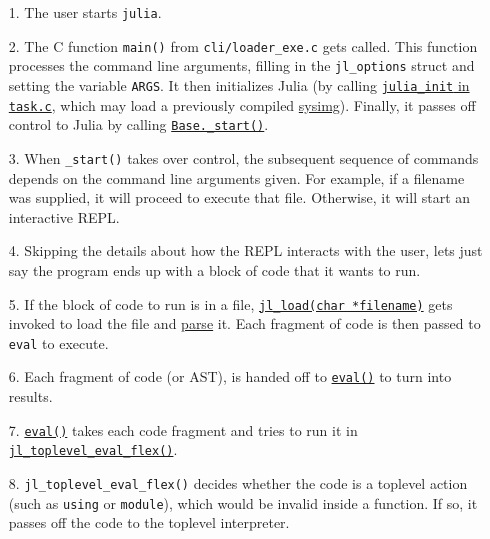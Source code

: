 \begin{itemize}
\item[1.  ] The user starts \texttt{julia}.


\item[2.  ] The C function \texttt{main()} from \texttt{cli/loader\_exe.c} gets called. This function processes the command line arguments, filling in the \texttt{jl\_options} struct and setting the variable \texttt{ARGS}. It then initializes Julia (by calling \href{https://github.com/JuliaLang/julia/blob/master/src/task.c}{\texttt{julia\_init} in \texttt{task.c}}, which may load a previously compiled \hyperlink{6082338945993475185}{sysimg}). Finally, it passes off control to Julia by calling \href{https://github.com/JuliaLang/julia/blob/master/base/client.jl}{\texttt{Base.\_start()}}.


\item[3.  ] When \texttt{\_start()} takes over control, the subsequent sequence of commands depends on the command line arguments given. For example, if a filename was supplied, it will proceed to execute that file. Otherwise, it will start an interactive REPL.


\item[4.  ] Skipping the details about how the REPL interacts with the user, let{\textquotesingle}s just say the program ends up with a block of code that it wants to run.


\item[5.  ] If the block of code to run is in a file, \href{https://github.com/JuliaLang/julia/blob/master/src/toplevel.c}{\texttt{jl\_load(char *filename)}} gets invoked to load the file and \hyperlink{14838640034628506824}{parse} it. Each fragment of code is then passed to \texttt{eval} to execute.


\item[6.  ] Each fragment of code (or AST), is handed off to \hyperlink{7507639810592563424}{\texttt{eval()}} to turn into results.


\item[7.  ] \hyperlink{7507639810592563424}{\texttt{eval()}} takes each code fragment and tries to run it in \href{https://github.com/JuliaLang/julia/blob/master/src/toplevel.c}{\texttt{jl\_toplevel\_eval\_flex()}}.


\item[8.  ] \texttt{jl\_toplevel\_eval\_flex()} decides whether the code is a {\textquotedbl}toplevel{\textquotedbl} action (such as \texttt{using} or \texttt{module}), which would be invalid inside a function. If so, it passes off the code to the toplevel interpreter.



\end{itemize}
